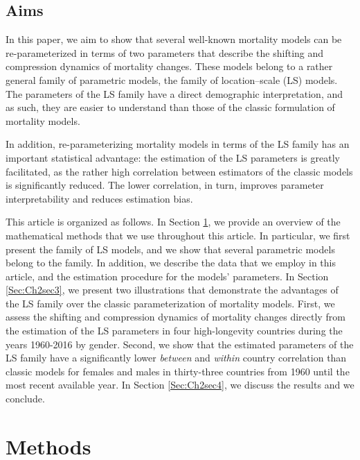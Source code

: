 \documentclass[Thesis]{subfiles}
\begin{document}
\subsection{Aims}
\label{Subsec:Ch2subsec1.3}

In this paper, we aim to show that several well-known mortality models can be re-parameterized in terms of two parameters that describe the shifting and compression dynamics of mortality changes. These models belong to a rather general family of parametric models, the family of location--scale (LS) models. The parameters of the LS family have a direct demographic interpretation, and as such, they are easier to understand than those of the classic formulation of mortality models.

In addition, re-parameterizing mortality models in terms of the LS family has an important statistical advantage: the estimation of the LS parameters is greatly facilitated, as the rather high correlation between estimators of the classic models is significantly reduced. The lower correlation, in turn, improves parameter interpretability and reduces estimation bias.

This article is organized as follows. In Section \ref{Sec:Ch2sec2}, we provide an overview of the mathematical methods that we use throughout this article. In particular, we first present the family of LS models, and we show that several parametric models belong to the family. In addition, we describe the data that we employ in this article, and the estimation procedure for the models' parameters. In Section \ref{Sec:Ch2sec3}, we present two illustrations that demonstrate the advantages of the LS family over the classic parameterization of mortality models. First, we assess the shifting and compression dynamics of mortality changes directly from the estimation of the LS parameters in four high-longevity countries during the years 1960-2016 by gender. Second, we show that the estimated parameters of the LS family have a significantly lower \textit{between} and \textit{within} country correlation than classic models for females and males in thirty-three countries from 1960 until the most recent available year. In Section \ref{Sec:Ch2sec4}, we discuss the results and we conclude.

\section{Methods}
\label{Sec:Ch2sec2}
\end{document}
